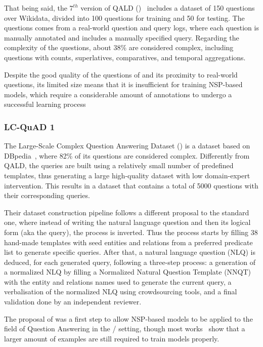 That being said, the $7^{th}$ version of QALD (\QALDseven)~\cite{dataset:qald7-UsbeckNHKRN17} includes a 
dataset of 150 questions over Wikidata, divided into 100 questions for training and 50 for 
testing. The questions comes from a real-world question and query logs, where each question is 
manually annotated and includes a manually specified \SPARQL{} query. Regarding the complexity of 
the questions, about 38\% are considered complex, including questions with counts, superlatives, 
comparatives, and temporal aggregations.

Despite the good quality of the questions of \QALDseven{} and its proximity to real-world questions, 
its limited size means that it is insufficient for training NSP-based models, which require a 
considerable amount of annotations to undergo a successful learning process

\subsubsection{LC-QuAD 1}
\label{cap2:qakg/benchmarkDatasets/lcquad}
The Large-Scale Complex Question Answering Dataset (\LCQuADone{}) is a dataset based on 
DBpedia~\cite{dataset:lcquad-TrivediMDL17}, where 82\% of its questions are considered complex. 
Differently from QALD, the \SPARQL{} queries are built using a relatively small number of 
predefined templates, thus generating a large high-quality dataset with low domain-expert 
intervention. This results in a dataset that contains a total of 5000 questions with their 
corresponding queries.

Their dataset construction pipeline follows a different proposal to the standard one, where 
instead of writing the natural language question and then its logical form (aka the \SPARQL{} 
query), the process is inverted. Thus the process starts by filling 38 hand-made \SPARQL{} 
templates with seed entities and relations from a preferred predicate list to generate specific 
\SPARQL{} queries. After that, a natural language question (NLQ) is deduced, for each generated 
\SPARQL{} query, following a three-step process: a generation of a normalized NLQ by filling a 
Normalized Natural Question Template (NNQT) with the entity and relations names used to 
generate the current query, a verbalisation of the normalized NLQ using crowdsourcing tools, 
and a final validation done by an independent reviewer.

The proposal of \LCQuADone{} was a first step to allow NSP-based models to be applied to the field 
of Question Answering in the \RDF{}/\SPARQL{} setting, though most works~\cite{qa:FuQTLYS20abs-2007-13069} 
show that a larger amount of examples are still required to train models properly.

